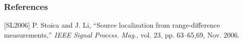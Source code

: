 \begin{frame} %
\frametitle{References}
\phantom{m}
%

\begin{thebibliography}{99} 

%
%
%
%
%
%
%
%
%
%
[SL2006] 
P. Stoica and J. Li, ``Source localization from range-difference measurements,'' {\em IEEE Signal Process. Mag.}, vol. 23, pp. 63--65,69, Nov. 2006.


\end{thebibliography}
\end{frame}
